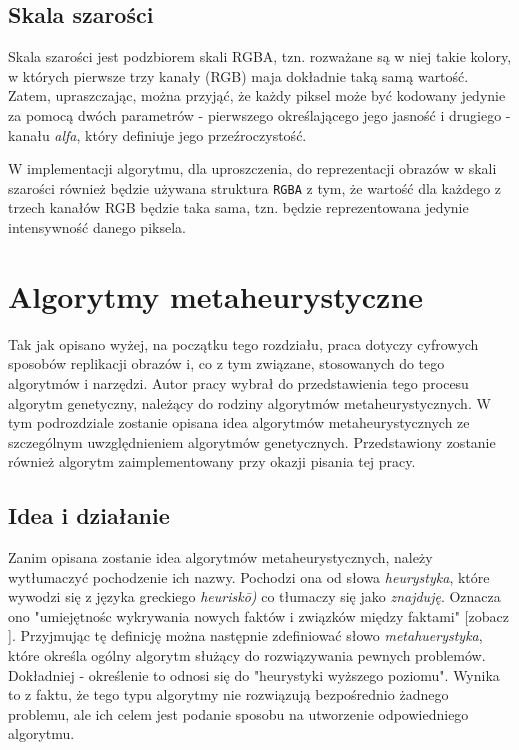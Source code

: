 \subsection{Skala szarości}

Skala szarości jest podzbiorem skali RGBA, tzn. rozważane są w niej takie kolory, w których pierwsze trzy kanały (RGB) maja dokładnie taką samą wartość. Zatem, upraszczając, można przyjąć, że każdy piksel może być kodowany jedynie za pomocą dwóch parametrów - pierwszego określającego jego jasność i drugiego - kanału \textit{alfa}, który definiuje jego przeźroczystość.

W implementacji algorytmu, dla uproszczenia, do reprezentacji obrazów w skali szarości również będzie używana struktura \texttt{RGBA} z tym, że wartość dla każdego z trzech kanałów RGB będzie taka sama, tzn. będzie reprezentowana jedynie intensywność danego piksela.

\section{Algorytmy metaheurystyczne}

Tak jak opisano wyżej, na początku tego rozdziału, praca dotyczy cyfrowych sposobów replikacji obrazów i, co z tym związane, stosowanych do tego algorytmów i narzędzi. Autor pracy wybrał do przedstawienia tego procesu algorytm genetyczny, należący do rodziny algorytmów metaheurystycznych. W tym podrozdziale zostanie opisana idea algorytmów metaheurystycznych ze szczególnym uwzględnieniem algorytmów genetycznych. Przedstawiony zostanie również algorytm zaimplementowany przy okazji pisania tej pracy.

\subsection{Idea i działanie}

Zanim opisana zostanie idea algorytmów metaheurystycznych, należy wytłumaczyć pochodzenie ich nazwy. Pochodzi ona od słowa \textit{heurystyka}, które wywodzi się z języka greckiego \textit{heuriskō)} co tłumaczy się jako \textit{znajduję}. Oznacza ono "umiejętnośc wykrywania nowych faktów i związków między faktami" [zobacz \cite{SJPHeurystyka}]. Przyjmując tę definicję można następnie zdefiniować słowo \textit{metahuerystyka}, które określa ogólny algorytm służący do rozwiązywania pewnych problemów. Dokładniej - określenie to odnosi się do "heurystyki wyższego poziomu". Wynika to z faktu, że tego typu algorytmy nie rozwiązują bezpośrednio żadnego problemu, ale ich celem jest podanie sposobu na utworzenie odpowiedniego algorytmu.


